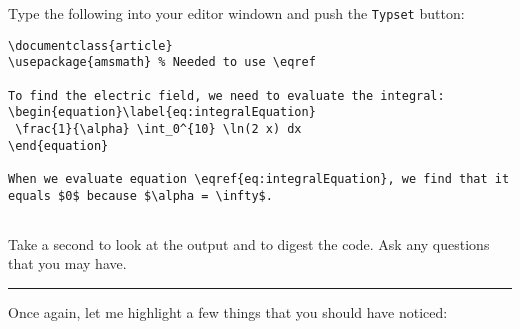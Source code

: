 \begin{enumerate}
\probtwo  Type the following into your editor windown and push the
\verb!Typset! button:
\begin{Verbatim}
\documentclass{article}
\usepackage{amsmath} % Needed to use \eqref

To find the electric field, we need to evaluate the integral:
\begin{equation}\label{eq:integralEquation}
 \frac{1}{\alpha} \int_0^{10} \ln(2 x) dx
\end{equation}

When we evaluate equation \eqref{eq:integralEquation}, we find that it
equals $0$ because $\alpha = \infty$.


\end{Verbatim}

 Take a second to look at the
output and to digest the code.  Ask any questions that you may have.

\noindent\rule{4.5 in}{0.01 in}
\end{enumerate}
\noindent Once again, let me highlight a few things that you should have noticed:
